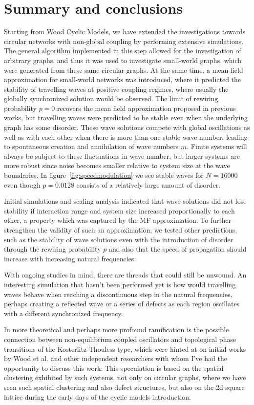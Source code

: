 \section{Summary and conclusions}

Starting from Wood Cyclic Models, we have extended the investigations towards circular networks with non-global coupling by performing
extensive simulations. The general algorithm implemented in this step allowed for the investigation of arbitrary graphs, and thus it
was used to investigate small-world graphs, which were generated from these same circular graphs. At the same time, a mean-field
approximation for small-world networks was introduced, where it predicted the stability of travelling waves at positive coupling
regimes, where usually the globally synchronized solution would be observed. The limit of rewiring probability $p=0$ recovers the mean
field approximation proposed in previous works, but travelling waves were predicted to be stable even when the underlying graph has
some disorder. These wave solutions compete with global oscillations as well as with each other when there is more than one stable wave
number, leading to spontaneous creation and annihilation of wave numbers $m$. Finite systems will always be subject to these
fluctuations in wave number, but larger systems are more robust since noise becomes smaller relative to system size at the wave
boundaries. In figure~\ref{fig:speedmodulation} we see stable waves for $N=16000$ even though $p=0.0128$ consists of a relatively large
amount of disorder.

Initial simulations and scaling analysis indicated that wave solutions did not lose stability if interaction range and system size
increased proportionally to each other, a property which was captured by the MF approximation. To further strengthen the validity of
such an approximation, we tested other predictions, such as the stability of wave solutions even with the introduction of disorder
through the rewiring probability $p$ and also that the speed of propagation should increase with increasing natural frequencies.

With ongoing studies in mind, there are threads that could still be unwound. An interesting simulation that hasn't been performed yet
is how would travelling waves behave when reaching a discontinuous step in the natural frequencies, perhaps creating a reflected wave
or a series of defects as each region oscillates with a different synchronized frequency.

In more theoretical and perhaps more profound ramification is the possible connection between non-equilibrium coupled oscillators and
topological phase transitions of the Kosterlitz-Thouless type, which were hinted at on initial works by Wood et al. \cite{Wood06a} and
other independent researchers with whom I've had the opportunity to discuss this work. This speculation is based on the spatial
clustering exhibited by such systems, not only on circular graphs, where we have seen such spatial clustering and also defect
structures, but also on the 2d square lattice during the early days of the cyclic models introduction.

